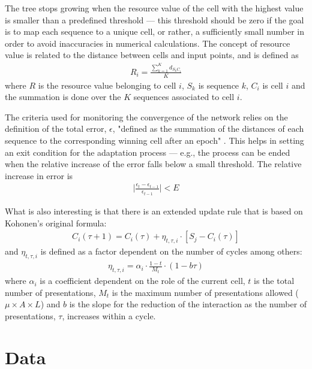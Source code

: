 \documentclass[11pt,twocolumn]{article}
\begin{document}
The tree stops growing when the resource value of the cell with the highest value is smaller than a predefined threshold — this threshold should be zero if the goal is to map each sequence to a unique cell, or rather, a sufficiently small number in order to avoid inaccuracies in numerical calculations. The concept of resource value is related to the distance between cells and input points, and is defined as
\begin{align}
R_i = \frac{\sum_{k = 1}^K d_{S_k C_i}}{K}
\end{align}
where $R$ is the resource value belonging to cell $i$, $S_k$ is sequence $k$, $C_i$ is cell $i$ and the summation is done over the $K$ sequences associated to cell $i$.

The criteria used for monitoring the convergence of the network relies on the definition of the total error, $\epsilon$, "defined as the summation of the distances of each sequence to the corresponding winning cell after an epoch" \cite{Dopazo1997}. This helps in setting an exit condition for the adaptation process — e.g., the process can be ended when the relative increase of the error falls below a small threshold. The relative increase in error is
\begin{align}
\Big|\frac{\epsilon_t - \epsilon_{t-1}}{\epsilon_{t-1}}\Big| < E
\end{align}

What is also interesting is that there is an extended update rule that is based on Kohonen's original formula:
\begin{align}
C_i(\tau + 1) = C_i(\tau) + \eta_{t, \tau, i} \cdot [S_j - C_i(\tau)]
\end{align}
and $\eta_{t, \tau, i}$ is defined as a factor dependent on the number of cycles among others:
\begin{align}
\eta_{t, \tau, i} = \alpha_i \cdot \frac{1 - t}{M_t} \cdot (1 - b\tau)
\end{align}
where $\alpha_i$ is a coefficient dependent on the role of the current cell, $t$ is the total number of presentations, $M_t$ is the maximum number of presentations allowed ($\mu \times A \times L$) and $b$ is the
slope for the reduction of the interaction as the number of presentations, $\tau$, increases within a cycle.

\section{Data}
\end{document}
